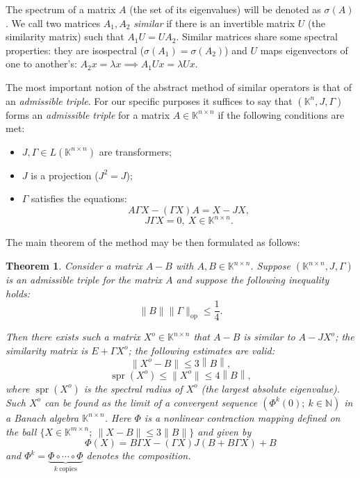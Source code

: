 \documentclass[a4paper]{jpconf}
\newtheorem{nkjpcsthm}{Theorem}
\begin{document}
The spectrum of a matrix \( A \)
    (the set of its eigenvalues)
    will be denoted as \( \sigma(A) \).
We call two matrices \( A_1, A_2 \) \emph{similar}
    if there is an invertible matrix \( U \)
    (the similarity matrix)
    such that \( A_1 U = U A_2 \).
Similar matrices share some spectral properties:
    they are isospectral (\( \sigma(A_1) = \sigma(A_2) \))
    and \( U \) maps eigenvectors of one to another's:
    \( A_2 x = \lambda x \implies A_1 U x = \lambda U x \).

The most important notion
    of the abstract method of similar operators
    is that of an \emph{admissible triple}.
For our specific purposes it suffices to say
    that \( (\mathbb{K}^n, J, \Gamma) \)
    forms an \emph{admissible triple}
    for a matrix \( A\in\mathbb{K}^{n{\times}n} \)
    if the following conditions are met:
\begin{itemize}
    \item \( J, \Gamma \in L(\mathbb{K}^{n{\times}n}) \)
        are transformers;
    \item \( J \) is a projection (\( J^2 = J \));
    \item  \( \Gamma \) satisfies the equations:
        \[
            A \Gamma X - (\Gamma X) A = X - JX,
        \]
        \[
            J\Gamma X = 0,\ X\in\mathbb{K}^{n{\times}n}.
        \]
\end{itemize}

The main theorem of the method
    may be then formulated as follows:

\begin{nkjpcsthm}
    Consider a matrix \( A - B \)
        with \( A, B \in \mathbb{K}^{n{\times}n} \).
    Suppose \( (\mathbb{K}^{n{\times}n}, J, \Gamma) \)
        is an admissible triple for the matrix \( A \)
        and suppose the following inequality holds:
        \[
            \|B\|\|\Gamma\|_{\mathrm{op}} \leq \frac14.
        \]

    Then there exists such a matrix \( X^o\in\mathbb{K}^{n{\times}n} \)
        that \( A - B \) is similar to \( A - J X^o \);
        the similarity matrix is \( E + \Gamma X^o \);
        the following estimates are valid:
        \[
            \|X^o - B\| \leq 3 \left\|B\right\|,
        \]
        \[
            \operatorname{spr}(X^o) \leq \|X^o\| \leq 4 \left\|B\right\|,
        \]
        where \( \operatorname{spr}(X^o) \)
        is the spectral radius of \( X^o \) (the largest absolute eigenvalue).
    Such \( X^o \) can be found as the limit of a convergent sequence
        \( \left( \Phi^k(0);\ k\in\mathbb{N} \right) \)
        in a Banach algebra \( \mathbb{K}^{n{\times}n} \).
        Here \( \Phi \) is a nonlinear contraction mapping
        defined on the ball \( \{X\in\mathbb{K}^{m{\times}n};\ \|X-B\|\leq 3\|B\| \} \)
        and given by
    \[
        \Phi(X) = B\Gamma X - (\Gamma X)J(B + B\Gamma X) + B
    \]
        and \( \Phi^k = \underbrace{\Phi\circ\cdots\circ\Phi}_{k\ \text{copies}} \)
        denotes the composition.
\end{nkjpcsthm}
\end{document}
